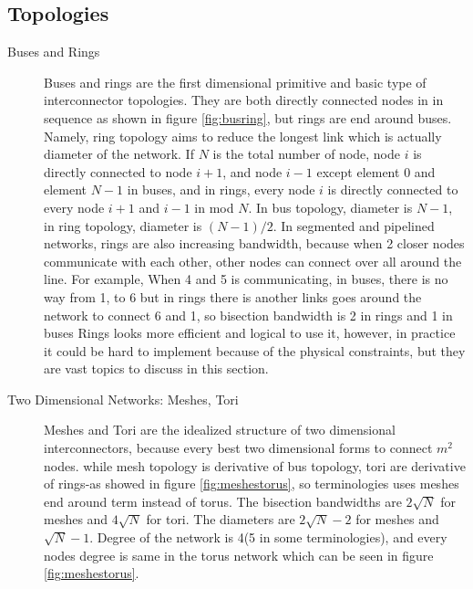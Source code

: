         \subsection{Topologies}
        \begin{description}
            \item[Buses and Rings] Buses and rings are the first dimensional primitive and basic type of interconnector topologies. They are both directly connected nodes in in sequence as shown in figure \ref{fig:busring}, but rings are end around buses. Namely, ring topology aims to reduce the longest link which is actually diameter of the network. If $N$ is the total number of node, node $i$ is directly connected to node $i+1$, and node $i-1$ except element $0$ and element $N-1$ in buses, and in rings, every node $i$ is directly connected to every node $i+1$ and $i-1$ in mod $N$.  In bus topology, diameter is $N-1$, in ring topology, diameter is $(N-1)/2$. In segmented and pipelined networks, rings are also increasing bandwidth, because when 2 closer nodes communicate with each other, other nodes can connect over all around the line. For example, When 4 and 5  is communicating, in buses, there is no way from 1, to 6 but in rings there is another links goes around the network to connect 6 and 1, so bisection bandwidth is 2 in rings and 1 in buses Rings looks more efficient and logical to use it, however, in practice it could be hard to implement because of the physical constraints, but they are vast topics to discuss in this section.
            \item[Two Dimensional Networks: Meshes, Tori] Meshes and Tori are the idealized structure of two dimensional interconnectors, because every best two dimensional forms to connect $m^2$ nodes. while mesh topology is derivative of bus topology, tori are derivative of rings-as showed in figure \ref{fig:meshestorus}, so terminologies uses meshes end around term instead of torus. The bisection bandwidths are $2\sqrt{N}$ for meshes and $4\sqrt{N}$ for tori. The diameters are $2\sqrt{N}-2$ for meshes and $\sqrt{N}-1$. Degree of the network is 4(5 in some terminologies), and every nodes degree is same in the torus network which can be seen in figure \ref{fig:meshestorus}.\cite{ComputerArchCoursera}

\end{description}
